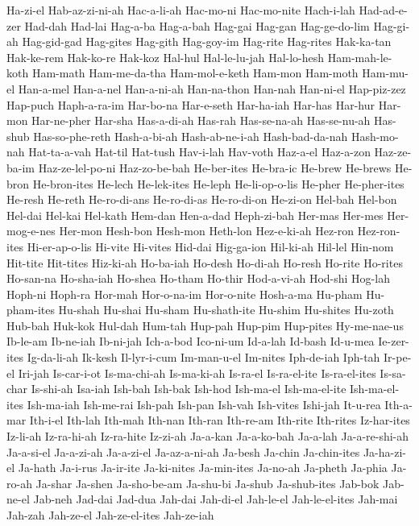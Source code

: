 {  Ha-zi-el Hab-az-zi-ni-ah Hac-a-li-ah Hac-mo-ni Hac-mo-nite Hach-i-lah
  Had-ad-e-zer Had-dah Had-lai Hag-a-ba Hag-a-bah Hag-gai
  Hag-gan Hag-ge-do-lim Hag-gi-ah Hag-gid-gad Hag-gites Hag-gith
  Hag-goy-im Hag-rite Hag-rites Hak-ka-tan Hak-ke-rem Hak-ko-re
  Hak-koz Hal-hul Hal-le-lu-jah Hal-lo-hesh Ham-mah-le-koth Ham-math
  Ham-me-da-tha Ham-mol-e-keth Ham-mon Ham-moth Ham-mu-el Han-a-mel
  Han-a-nel Han-a-ni-ah Han-na-thon Han-nah Han-ni-el Hap-piz-zez
  Hap-puch Haph-a-ra-im Har-bo-na Har-e-seth Har-ha-iah Har-has
  Har-hur Har-mon Har-ne-pher Har-sha Has-a-di-ah Has-rah
  Has-se-na-ah Has-se-nu-ah Has-shub Has-so-phe-reth Hash-a-bi-ah Hash-ab-ne-i-ah
  Hash-bad-da-nah Hash-mo-nah Hat-ta-a-vah Hat-til Hat-tush Hav-i-lah
  Hav-voth Haz-a-el Haz-a-zon Haz-ze-ba-im Haz-ze-lel-po-ni Haz-zo-be-bah
  He-ber-ites He-bra-ic He-brew He-brews He-bron He-bron-ites
  He-lech He-lek-ites He-leph He-li-op-o-lis He-pher He-pher-ites
  He-resh He-reth He-ro-di-ans He-ro-di-as He-ro-di-on He-zi-on
  Hel-bah Hel-bon Hel-dai Hel-kai Hel-kath Hem-dan
  Hen-a-dad Heph-zi-bah Her-mas Her-mes Her-mog-e-nes Her-mon
  Hesh-bon Hesh-mon Heth-lon Hez-e-ki-ah Hez-ron Hez-ron-ites
  Hi-er-ap-o-lis Hi-vite Hi-vites Hid-dai Hig-ga-ion Hil-ki-ah
  Hil-lel Hin-nom Hit-tite Hit-tites Hiz-ki-ah Ho-ba-iah
  Ho-desh Ho-di-ah Ho-resh Ho-rite Ho-rites Ho-san-na
  Ho-sha-iah Ho-shea Ho-tham Ho-thir Hod-a-vi-ah Hod-shi
  Hog-lah Hoph-ni Hoph-ra Hor-mah Hor-o-na-im Hor-o-nite
  Hosh-a-ma Hu-pham Hu-pham-ites Hu-shah Hu-shai Hu-sham
  Hu-shath-ite Hu-shim Hu-shites Hu-zoth Hub-bah Huk-kok
  Hul-dah Hum-tah Hup-pah Hup-pim Hup-pites Hy-me-nae-us
  Ib-le-am Ib-ne-iah Ib-ni-jah Ich-a-bod Ico-ni-um Id-a-lah
  Id-bash Id-u-mea Ie-zer-ites Ig-da-li-ah Ik-kesh Il-lyr-i-cum
  Im-man-u-el Im-nites Iph-de-iah Iph-tah Ir-pe-el Iri-jah
  Is-car-i-ot Is-ma-chi-ah Is-ma-ki-ah Is-ra-el Is-ra-el-ite Is-ra-el-ites
  Is-sa-char Is-shi-ah Isa-iah Ish-bah Ish-bak Ish-hod
  Ish-ma-el Ish-ma-el-ite Ish-ma-el-ites Ish-ma-iah Ish-me-rai Ish-pah
  Ish-pan Ish-vah Ish-vites Ishi-jah It-u-rea Ith-a-mar
  Ith-i-el Ith-lah Ith-mah Ith-nan Ith-ran Ith-re-am
  Ith-rite Ith-rites Iz-har-ites Iz-li-ah Iz-ra-hi-ah Iz-ra-hite
  Iz-zi-ah Ja-a-kan Ja-a-ko-bah Ja-a-lah Ja-a-re-shi-ah Ja-a-si-el
  Ja-a-zi-ah Ja-a-zi-el Ja-az-a-ni-ah Ja-besh Ja-chin Ja-chin-ites
  Ja-ha-zi-el Ja-hath Ja-i-rus Ja-ir-ite Ja-ki-nites Ja-min-ites
  Ja-no-ah Ja-pheth Ja-phia Ja-ro-ah Ja-shar Ja-shen
  Ja-sho-be-am Ja-shu-bi Ja-shub Ja-shub-ites Jab-bok Jab-ne-el
  Jab-neh Jad-dai Jad-dua Jah-dai Jah-di-el Jah-le-el
  Jah-le-el-ites Jah-mai Jah-zah Jah-ze-el Jah-ze-el-ites Jah-ze-iah
}
